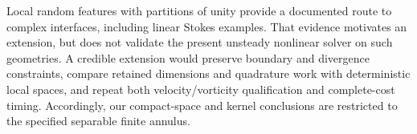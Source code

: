 Local random features with partitions of unity provide a documented route to complex interfaces, including linear Stokes examples\cite{r20}. That evidence motivates an extension, but does not validate the present unsteady nonlinear solver on such geometries. A credible extension would preserve boundary and divergence constraints, compare retained dimensions and quadrature work with deterministic local spaces, and repeat both velocity/vorticity qualification and complete-cost timing. Accordingly, our compact-space and kernel conclusions are restricted to the specified separable finite annulus.



